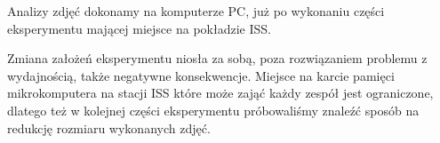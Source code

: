 Analizy zdjęć dokonamy na komputerze PC, już po wykonaniu części eksperymentu mającej
miejsce na pokładzie ISS.

Zmiana założeń eksperymentu niosła za sobą, poza rozwiązaniem problemu z wydajnością, także negatywne
konsekwencje. Miejsce na karcie pamięci mikrokomputera na stacji ISS które może zająć każdy zespół jest
ograniczone, dlatego też w kolejnej części eksperymentu próbowaliśmy znaleźć sposób na redukcję rozmiaru
wykonanych zdjęć.
